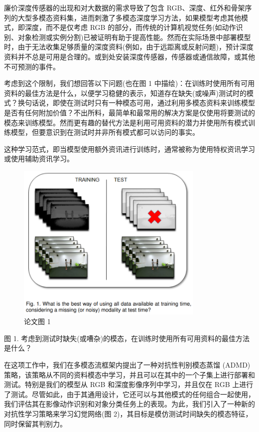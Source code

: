 廉价深度传感器的出现和对大数据的需求导致了包含 RGB、深度、红外和骨架序列的大型多模态资料集，进而刺激了多模态深度学习方法，如果模型考虑其他模式，即深度，而不是仅考虑 RGB 的部分，而传统的计算机视觉任务(如动作识别、对象检测或实例分割)已被证明有助于提高性能。然而在实际场景中部署模型时，由于无法收集足够质量的深度资料(例如，由于远距离或反射问题)，预计深度资料并不总是可用是合理的。或到处安装深度传感器，传感器或通信故障，或其他不可预测的事件。


考虑到这个限制，我们想回答以下问题(也在图 1 中描绘)：在训练时使用所有可用资料的最佳方法是什么，以便学习稳健的表示，知道存在缺失(或噪声)测试时的模式？换句话说，即使在测试时只有一种模态可用，通过利用多模态资料来训练模型是否有任何附加价值？不出所料，最简单和最常用的解决方案是仅使用将要测试的模态来训练模型。然而更有趣的替代方法是利用可用资料的潜力并使用所有模式训练模型，但要意识到在测试时并非所有模式都可以访问的事实。


这种学习范式，即当模型使用额外资讯进行训练时，通常被称为使用特权资讯学习或使用辅助资讯学习。

\begin{figure}[htb]
\centering 
\includegraphics[width=0.80\textwidth]{img/c1m1.png} 
\caption{论文图 1}
\label{Test}
\end{figure}

图 1. 考虑到测试时缺失(或嘈杂)的模态，在训练时使用所有可用资料的最佳方法是什么？

在这项工作中，我们在多模态流框架内提出了一种对抗性判别模态蒸馏 (ADMD) 策略，该策略从不同的资料模态中学习，并且可以在其中的一个子集上进行部署和测试。特别是我们的模型从 RGB 和深度影像序列中学习，并且仅在 RGB 上进行了测试。尽管如此，由于其通用设计，它还可以与其他模式的任何组合一起使用，我们评估其在影像动作识别和对象分类任务上的表现。为此，我们引入了一种新的对抗性学习策略来学习幻觉网络(图 2)，其目标是模仿测试时间缺失的模态特征，同时保留其判别力。

